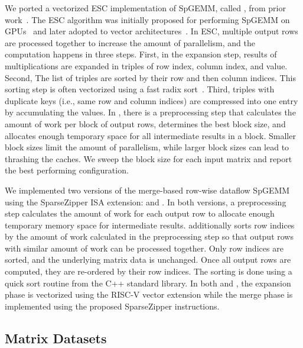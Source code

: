  We ported a
vectorized ESC implementation of SpGEMM, called , from
prior work~\cite{fevre-spgemm-rvv-2023}. The ESC algorithm was initially
proposed for performing SpGEMM on
GPUs~\cite{dalton-spgemm-gpu-2015,winter-adaptive-spgemm-gpu-ppopp2019}
and later adopted to vector
architectures~\cite{fevre-spgemm-rvv-2023,li-spgemm-vector-arch-mchpc2019}.
In ESC, multiple output rows are processed together to increase the
amount of parallelism, and the computation happens in three steps. First,
in the expansion step, results of multiplications are expanded in triples
of row index, column index, and value. Second, The list of triples are
sorted by their row and then column indices. This sorting step is often
vectorized using a fast radix sort~\cite{zaha-vector-rsort-sc1991}.
Third, triples with duplicate keys (i.e., same row and column indices) are
compressed into one entry by accumulating the values.
In , there is a preprocessing step that calculates the amount of
work per block of output rows, determines the best block size, and allocates
enough temporary space for all intermediate results in a block.
Smaller block sizes limit the amount of parallelism,
while larger block sizes can lead to thrashing the caches. We sweep the
block size for each input matrix and report the best performing
configuration.

We implemented two versions of the merge-based row-wise dataflow SpGEMM using
the SparseZipper ISA extension:  and .
In both versions, a preprocessing step calculates the amount of work for each
output row to allocate enough temporary memory space for intermediate results.
 additionally sorts row indices by the amount of
work calculated in the preprocessing step so that output rows with similar
amount of work can be processed together.
Only row indices are sorted, and the underlying matrix data is unchanged.
Once all output rows are computed, they are re-ordered by their row indices.
The sorting is done using a quick sort routine from the C++ standard library.
In both  and , the expansion phase is vectorized using
the RISC-V vector extension while the merge phase is implemented using the
proposed SparseZipper instructions.

\subsection{Matrix Datasets}

